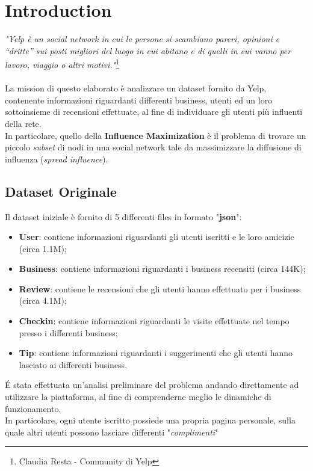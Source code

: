 
\chapter{Introduction}
\textit{"Yelp è un social network in cui le persone si scambiano pareri, opinioni e “dritte” sui posti migliori del luogo in cui abitano e di quelli in cui vanno per lavoro, viaggio o altri motivi."}\footnote{Claudia Resta - Community di Yelp}\\\\
La mission di questo elaborato è analizzare un dataset fornito da Yelp, contenente informazioni riguardanti differenti business, utenti ed un loro sottoinsieme di recensioni effettuate, al fine di individuare gli utenti più influenti della rete.\\
In particolare, quello della \textbf{Influence Maximization} è il problema di trovare un piccolo \textit{subset} di nodi in una social network tale da  massimizzare la diffusione di influenza (\textit{spread influence}).

\section{Dataset Originale}
Il dataset iniziale è fornito di 5 differenti files in formato "\textbf{json}":
\begin{itemize}
	\item \textbf{User}: contiene informazioni riguardanti gli utenti iscritti e le loro amicizie (circa 1.1M);
	\item \textbf{Business}: contiene informazioni riguardanti i business recensiti (circa 144K);
	\item \textbf{Review}: contiene le recensioni che gli utenti hanno effettuato per i business (circa 4.1M);
	\item \textbf{Checkin}: contiene informazioni riguardanti le visite effettuate nel tempo presso i differenti business;
	\item \textbf{Tip}: contiene informazioni riguardanti i suggerimenti che gli utenti hanno lasciato ai differenti business.
\end{itemize}

\'E stata effettuata un'analisi preliminare del problema andando direttamente ad utilizzare la piattaforma, al fine di comprenderne meglio le dinamiche di funzionamento.\\
In particolare, ogni utente iscritto possiede una propria pagina personale, sulla quale altri utenti possono lasciare differenti "\textit{complimenti}"
